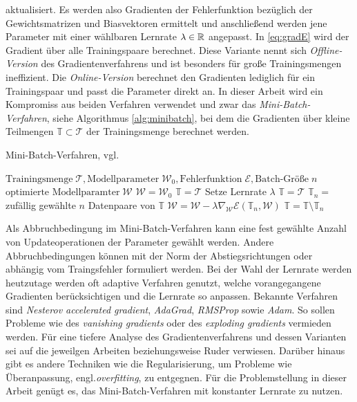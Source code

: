 aktualisiert. Es werden also Gradienten der Fehlerfunktion bezüglich der Gewichtsmatrizen und Biasvektoren ermittelt und anschließend werden jene Parameter mit einer wählbaren Lernrate $\lambda \in \mathbb{R}$ angepasst. In \ref{eq:gradE} wird der Gradient über alle Trainingspaare berechnet. Diese Variante nennt sich \textit{Offline-Version} des Gradientenverfahrens und ist besonders für große Trainingsmengen ineffizient. Die \textit{Online-Version} berechnet den Gradienten lediglich für ein Trainingspaar und passt die Parameter direkt an. In dieser Arbeit wird ein Kompromiss aus beiden Verfahren verwendet und zwar das \textit{Mini-Batch-Verfahren}, siehe Algorithmus \ref{alg:minibatch}, bei dem die Gradienten über kleine Teilmengen $\mathbb{T} \subset \mathcal{T}$ der Trainingsmenge berechnet werden.

\begin{algorithm}
    \caption{Mini-Batch-Verfahren, vgl. \cite{gruening}}\label{alg:minibatch}
    \begin{algorithmic}
    \Require $ \text{Trainingsmenge} \; \mathcal{T}, \text{Modellparameter} \; \mathcal{W}_0, \text{Fehlerfunktion} \; \mathcal{E}, \text{Batch-Größe} \; n$
    \Ensure $\text{optimierte Modellparamter} \; \mathcal{W}$
    \State $\mathcal{W}=\mathcal{W}_0$
    \State $\mathbb{T}=\mathcal{T}$
    \State Setze Lernrate $\lambda$      
     
        \State $\mathbb{T}=\mathcal{T}$
    \EndIf
    \State $\mathbb{T}_n=$ zufällig gewählte $n$ Datenpaare von $\mathbb{T}$ 
    \State $\mathcal{W}=\mathcal{W}-\lambda \nabla_{\mathcal{W}} \mathcal{E}(\mathbb{T}_n,\mathcal{W})$
    \State $\mathbb{T}= \mathbb{T} \setminus \mathbb{T}_n$
    \EndWhile
    \end{algorithmic}
\end{algorithm}

Als Abbruchbedingung im Mini-Batch-Verfahren kann eine fest gewählte Anzahl von Updateoperationen der Parameter gewählt werden. Andere Abbruchbedingungen können mit der Norm der Abstiegsrichtungen\cite{bishop2006pattern} oder abhängig vom Traingsfehler formuliert werden. Bei der Wahl der Lernrate werden heutzutage werden oft adaptive Verfahren genutzt, welche vorangegangene Gradienten berücksichtigen und die Lernrate so anpassen. Bekannte Verfahren sind \textit{Nesterov accelerated
gradient}\cite{sutskever2013importance}, \textit{AdaGrad}\cite{duchi2011adaptive}, \textit{RMSProp}\cite{tieleman2012lecture} sowie \textit{Adam}\cite{Kingma2015AdamAM}. So sollen Probleme wie des \textit{vanishing gradients} oder des \textit{exploding gradients} vermieden werden\cite{hanin2018neural}.
Für eine tiefere Analyse des Gradientenverfahrens und dessen Varianten sei auf die jeweilgen Arbeiten beziehungsweise Ruder\cite{ruder2016overview,} verwiesen. Darüber hinaus gibt es andere Techniken wie die Regularisierung, um Probleme wie Überanpassung, engl.\textit{overfitting}, zu entgegnen.
Für die Problemstellung in dieser Arbeit genügt es, das Mini-Batch-Verfahren mit konstanter Lernrate zu nutzen. 

